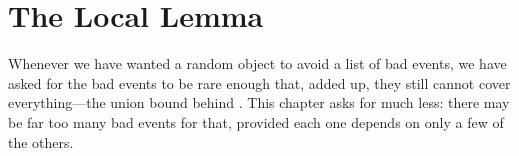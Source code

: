 \chapter{The Local Lemma} \label{Ch5:CH}
\thispagestyle{empty}

Whenever we have wanted a random object to avoid a list of bad events, we have asked for the bad events to be rare enough that, added up, they still cannot cover everything---the union bound behind . This chapter asks for much less: there may be far too many bad events for that, provided each one depends on only a few of the others.



